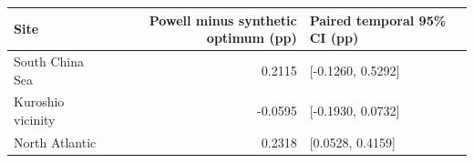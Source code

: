 \begin{tabular}{lrl}
\toprule
Site & Powell minus synthetic optimum (pp) & Paired temporal 95\% CI (pp) \\
\midrule
South China Sea & 0.2115 & [-0.1260, 0.5292] \\
Kuroshio vicinity & -0.0595 & [-0.1930, 0.0732] \\
North Atlantic & 0.2318 & [0.0528, 0.4159] \\
\bottomrule
\end{tabular}
